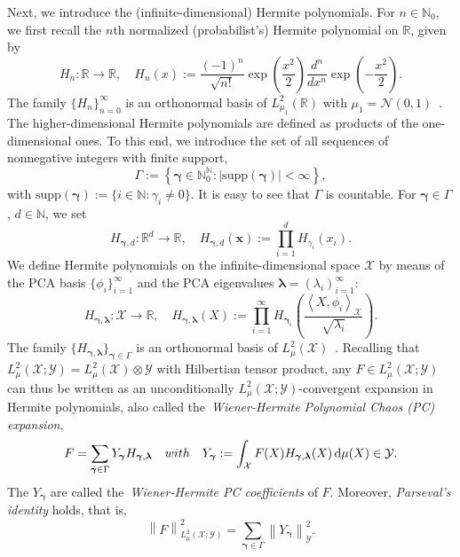 \documentclass[namedate,webpdf]{ima-authoring-template-blank}
\newcommand*{\supp}{\mathrm{supp}}
\def\D{\,\mathrm{d}}
\newcommand*{\nm}[1]{{\left\|#1\right \|}}
\newcommand{\abs}[1]{\left|#1\right|}
\newcommand*{\ip}[2]{\left\langle #1, #2 \right\rangle}
\numberwithin{counter}{section}
\numberwithin{equation}{section}
\theoremstyle{plain}
\theoremstyle{definition}
\newcommand*{\cN}{\mathcal{N}}
\newcommand*{\cX}{\mathcal{X}}
\newcommand*{\cY}{\mathcal{Y}}
\newcommand*{\bbN}{\mathbb{N}}
\newcommand*{\bbR}{\mathbb{R}}
\theoremstyle{thmstyletwo}
\begin{document}
Next, we introduce the (infinite-dimensional) Hermite polynomials. For \(n \in \bbN_0\), we first recall the \(n\)th normalized (probabilist's) Hermite polynomial on \(\bbR\), given by
\[
H_n: \bbR \to \bbR, \quad H_n(x) := \frac{(-1)^n}{\sqrt{n!}} \exp \left( \frac{x^2}{2} \right) \frac{d^n}{d x^n} \exp \left( -\frac{x^2}{2} \right).
\]
The family \(\{H_n\}_{n = 0}^{\infty}\) is an orthonormal basis of \(L_{\mu_1}^2(\bbR)\) with \( \mu_1 = \cN(0,1) \)~\citep[Prop. 9.4]{daprato_IntroductionInfiniteDimensionalAnalysis_2006}. The higher-dimensional Hermite polynomials are defined as products of the one-dimensional ones. To this end, we introduce the set of all sequences of nonnegative integers with finite support,
\[
\Gamma := \left\{\bm{\gamma}\in\bbN_0^{\bbN} : \abs{\supp(\bm{\gamma})} < \infty\right\},
\]
with \(\supp(\bm{\gamma}) := \{i \in \bbN : \gamma_i \neq 0\}\). It is easy to see that \(\Gamma\) is countable.
For \(\bm{\gamma} \in \Gamma\), \(d \in \bbN\), we set
\begin{equation}
\label{eq: definition of Hermite polynomials on bbR^d}
    H_{\bm{\gamma}, d}: \bbR^d \to \bbR, \quad 
    H_{\bm{\gamma}, d}(\bm{x}) := \prod_{i = 1}^d H_{\gamma_i}(x_i).
\end{equation}
We define Hermite polynomials on the infinite-dimensional space \(\cX\) by means of the PCA basis \(\{\phi_i\}_{i = 1}^{\infty}\) and the PCA eigenvalues \(\bm{\lambda} = (\lambda_i)_{i = 1}^{\infty}\):
\begin{equation}
\label{eq: definition of inf.-dim. Hermite polynomials on cX}
    H_{\bm{\bm{\gamma}}, \bm{\lambda}} : \cX \to \bbR, \quad 
    H_{\bm{\bm{\gamma}}, \bm{\lambda}}(X) := \prod_{i = 1}^{\infty} H_{\bm{\bm{\gamma}}_i}\left(\frac{\ip{X}{\phi_i}_{\cX}}{\sqrt{\lambda_i}}\right).
\end{equation}
The family \(\{H_{\bm{\gamma}, \bm{\lambda}}\}_{\bm{\gamma}\in\Gamma}\) is an orthonormal basis of \(L_{\mu}^2(\cX)\)~\citep[Thm. 9.7]{daprato_IntroductionInfiniteDimensionalAnalysis_2006}.
Recalling that
\(
L_{\mu}^2(\cX; \cY) = L_{\mu}^2(\cX) \otimes \cY 
\)
with Hilbertian tensor product, any \(F \in L_{\mu}^2(\cX; \cY)\) can thus be written as an unconditionally \(L_{\mu}^2(\cX; \cY)\)-convergent expansion in Hermite polynomials, also called the~\emph{Wiener-Hermite Polynomial Chaos (PC) expansion},
\begin{equation}
\label{eq: polynomial expansion of L2 operators}
    F = \sum_{\bm{\gamma} \in \Gamma} Y_{\bm{\gamma}} H_{\bm{\gamma}, \bm{\lambda}}
    \quad \textup{with} \quad Y_{\bm{\gamma}} := \int_{\cX} F(X) H_{\bm{\gamma}, \bm{\lambda}}(X) \D \mu(X) \in \cY.
\end{equation}
The \(Y_{\bm{\gamma}}\) are called the~\emph{Wiener-Hermite PC coefficients} of \(F\).
Moreover, \emph{Parseval's identity} holds, that is,
\begin{equation}\label{eq: Parseval's identity}
    \nm{F}_{L_{\mu}^2(\cX; \cY)}^2 = \sum_{\bm{\gamma} \in \Gamma} \nm{Y_{\bm{\gamma}}}_{\cY}^2.
\end{equation}
\end{document}
